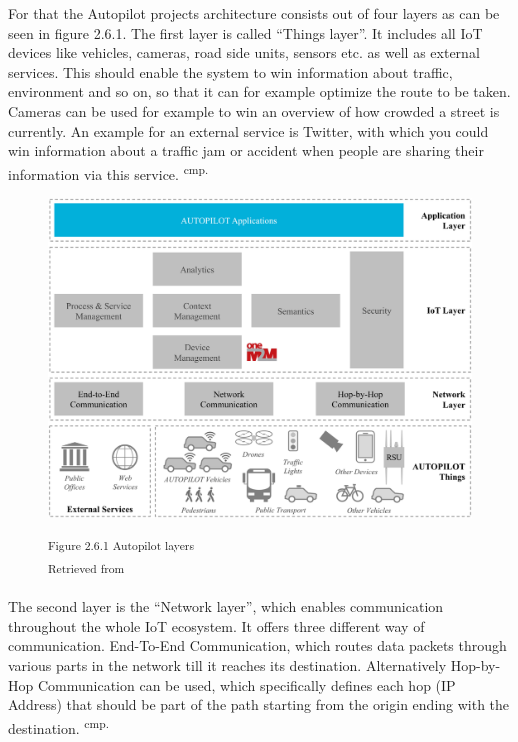 For that the Autopilot projects architecture consists out of four layers as can be seen in figure 2.6.1. The first layer is called ``Things layer''. It includes all IoT devices like vehicles, cameras, road side units, sensors etc. as well as external services. This should enable the system to win information about traffic, environment and so on, so that it can for example optimize the route to be taken. Cameras can be used for example to win an overview of how crowded a street is currently. An example for an external service is Twitter, with which you could win information about a traffic jam or accident when people are sharing their information via this service. \textsuperscript{cmp.\cite{5}}

\begin{figure}[h]
\centering
\includegraphics[width=\textwidth/5*4]{images/autopilot_layers.png}

\textsuperscript{Figure 2.6.1 Autopilot layers}\\
\textsuperscript{Retrieved from \cite{5}}
\end{figure}

The second layer is the ``Network layer'', which enables communication throughout the whole IoT ecosystem. It offers three different way of communication. End-To-End Communication, which routes data packets through various parts in the network till it reaches its destination. Alternatively Hop-by-Hop Communication can be used, which specifically defines each hop (IP Address) that should be part of the path starting from the origin ending with the destination. \textsuperscript{cmp.\cite{5}}

